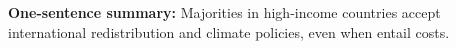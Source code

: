 \documentclass[12pt,english]{article}
\begin{document}
\noindent\textbf{One-sentence summary:} Majorities in high-income countries accept international redistribution and climate policies, even when entail costs.



\clearpage

\onehalfspacing %
\end{document}
